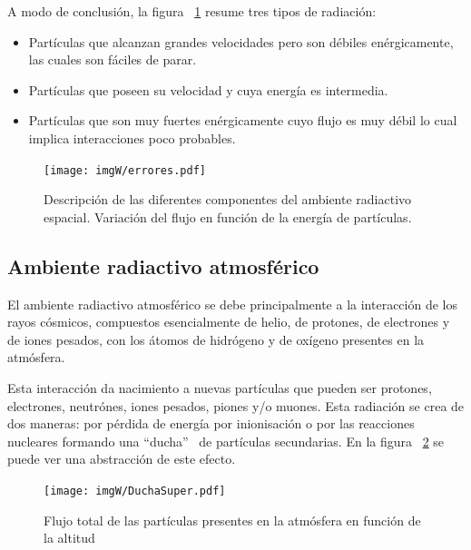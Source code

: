 \documentclass[a4paper,openright,12pt]{report}
\begin{document}
A modo de conclusión, la figura ~\ref{anomalia} resume tres tipos de radiación:
\begin{itemize}
\item{} Partículas que  alcanzan grandes velocidades pero son débiles enérgicamente, las cuales son fáciles de parar.
\item{}Partículas que poseen su velocidad y cuya energía es intermedia. 
\item{}  Partículas que son muy fuertes enérgicamente cuyo flujo es muy débil lo cual implica interacciones poco probables.

\end{itemize}



\begin{figure}[H]
	\centering
	\texttt{[image: imgW/errores.pdf]}
	\caption{Descripción de las diferentes componentes del ambiente radiactivo espacial. Variación del flujo en función de la energía de partículas.  }
	\label{anomalia}
\end{figure}



\subsection{Ambiente radiactivo atmosférico}

El ambiente radiactivo atmosférico se debe principalmente a la interacción de los rayos cósmicos, compuestos esencialmente de helio, de protones, de electrones y de iones pesados, con los átomos de hidrógeno y de oxígeno presentes en la atmósfera.

Esta interacción da nacimiento a nuevas partículas que pueden ser protones, electrones, neutrónes, iones pesados, piones y/o muones. Esta radiación se crea de dos maneras:  por pérdida de energía por inionisación o  por las reacciones nucleares formando una ``ducha'' \mbox{ }de partículas secundarias. En la figura ~\ref{Ducha} se puede ver una abstracción de este efecto.

\begin{figure}[H]
	\centering
	\texttt{[image: imgW/DuchaSuper.pdf]}
	\caption{Flujo total de las partículas  presentes en la atmósfera en función de la altitud  }
	\label{Ducha}
\end{figure}
\end{document}
